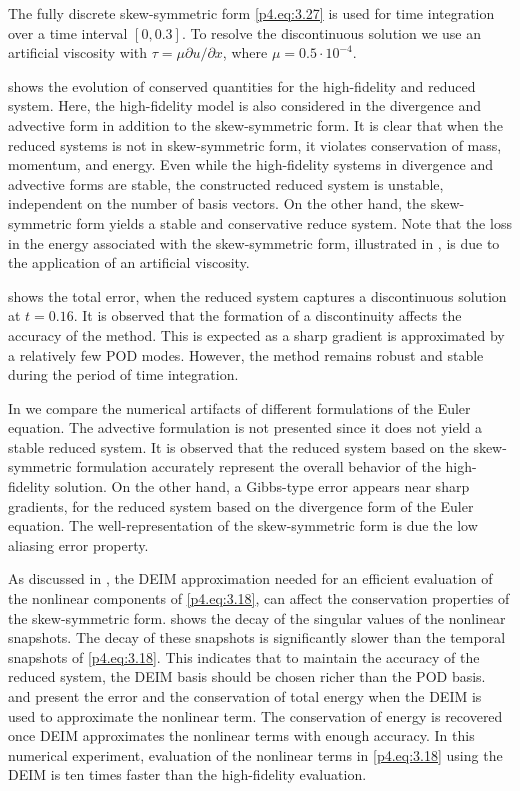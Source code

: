 The fully discrete skew-symmetric form \eqref{p4.eq:3.27} is used for time integration over a time interval $[0,0.3]$. To resolve the discontinuous solution we use an artificial viscosity with $\tau = \mu \partial u / \partial x$, where $\mu = 0.5 \cdot 10^{-4}$.

 shows the evolution of conserved quantities for the high-fidelity and reduced system. Here, the high-fidelity model is also considered in the divergence and advective form in addition to the skew-symmetric form. It is clear that when the reduced systems is not in skew-symmetric form, it violates conservation of mass, momentum, and energy. Even while the high-fidelity systems in divergence and advective forms are stable, the constructed reduced system is unstable, independent on the number of basis vectors. On the other hand, the skew-symmetric form yields a stable and conservative reduce system. Note that the loss in the energy associated with the skew-symmetric form, illustrated in , is due to the application of an artificial viscosity. 

 shows the total error, when the reduced system captures a discontinuous solution at $t=0.16$. It is observed that the formation of a discontinuity affects the accuracy of the method. This is expected as a sharp gradient is approximated by a relatively few POD modes. However, the method remains robust and stable during the period of time integration.

In  we compare the numerical artifacts of different formulations of the Euler equation. The advective formulation is not presented since it does not yield a stable reduced system. It is observed that the reduced system based on the skew-symmetric formulation accurately represent the overall behavior of the high-fidelity solution. On the other hand, a Gibbs-type error \cite{thompson1992fourier} appears near sharp gradients, for the reduced system based on the divergence form of the Euler equation. The well-representation of the skew-symmetric form is due the low aliasing error property. 

As discussed in , the DEIM approximation needed for an efficient evaluation of the nonlinear components of \eqref{p4.eq:3.18}, can affect the conservation properties of the skew-symmetric form.  shows the decay of the singular values of the nonlinear snapshots. The decay of these snapshots is significantly slower than the temporal snapshots of \eqref{p4.eq:3.18}. This indicates that to maintain the accuracy of the reduced system, the DEIM basis should be chosen richer than the POD basis.  and  present the error and the conservation of total energy when the DEIM is used to approximate the nonlinear term. The conservation of energy is recovered once DEIM approximates the nonlinear terms with enough accuracy. 
In this numerical experiment, evaluation of the nonlinear terms in \eqref{p4.eq:3.18} using the DEIM is ten times faster than the high-fidelity evaluation.

